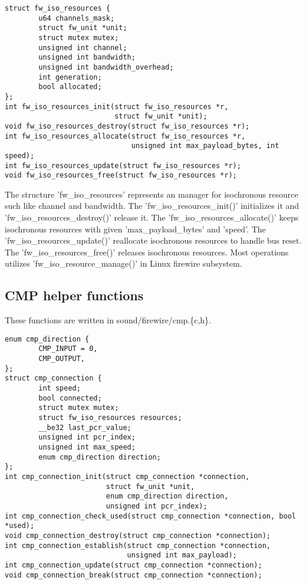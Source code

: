 \documentclass[onecolumn]{jarticle}
\begin{document}
\begin{verbatim}
struct fw_iso_resources {
        u64 channels_mask;
        struct fw_unit *unit;
        struct mutex mutex;
        unsigned int channel;
        unsigned int bandwidth;
        unsigned int bandwidth_overhead;
        int generation;
        bool allocated;
};
int fw_iso_resources_init(struct fw_iso_resources *r,
                          struct fw_unit *unit);
void fw_iso_resources_destroy(struct fw_iso_resources *r);
int fw_iso_resources_allocate(struct fw_iso_resources *r,
                              unsigned int max_payload_bytes, int speed);
int fw_iso_resources_update(struct fw_iso_resources *r);
void fw_iso_resources_free(struct fw_iso_resources *r);
\end{verbatim}

The structure 'fw\_iso\_resources' represents an manager for isochronous resource such like channel and bandwidth. The 'fw\_iso\_resources\_init()' initializes it and 'fw\_iso\_resources\_destroy()' release it.
The 'fw\_iso\_resources\_allocate()' keeps isochronous resources with given 'max\_payload\_bytes' and 'speed'. The 'fw\_iso\_resources\_update()' reallocate isochronous resources to handle bus reset. The 'fw\_iso\_resources\_free()' releases isochronous resources. Most operations utilizes 'fw\_iso\_resource\_manage()' in Linux firewire subsystem.

\subsection{CMP helper functions}

These functions are written in sound/firewire/cmp.\{c,h\}.

\begin{verbatim}
enum cmp_direction {
        CMP_INPUT = 0,
        CMP_OUTPUT,
};
struct cmp_connection {
        int speed;
        bool connected;
        struct mutex mutex;
        struct fw_iso_resources resources;
        __be32 last_pcr_value;
        unsigned int pcr_index;
        unsigned int max_speed;
        enum cmp_direction direction;
};
int cmp_connection_init(struct cmp_connection *connection,
                        struct fw_unit *unit,
                        enum cmp_direction direction,
                        unsigned int pcr_index);
int cmp_connection_check_used(struct cmp_connection *connection, bool *used);
void cmp_connection_destroy(struct cmp_connection *connection);
int cmp_connection_establish(struct cmp_connection *connection,
                             unsigned int max_payload);
int cmp_connection_update(struct cmp_connection *connection);
void cmp_connection_break(struct cmp_connection *connection);
\end{verbatim}
\end{document}
